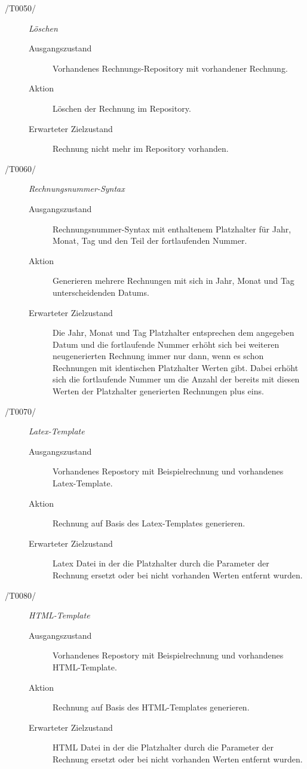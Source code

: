\begin{description}
  \item[/T0050/]
    \textit{Löschen}
    \begin{description}
    	\item[Ausgangszustand]
    	Vorhandenes Rechnungs-Repository mit vorhandener Rechnung.
    	\item[Aktion]
    	Löschen der Rechnung im Repository.
    	\item[Erwarteter Zielzustand]
    	Rechnung nicht mehr im Repository vorhanden.
    \end{description}
   
  \item[/T0060/]
    \textit{Rechnungsnummer-Syntax}
    \begin{description}
    	\item[Ausgangszustand]
    	Rechnungsnummer-Syntax mit enthaltenem Platzhalter für Jahr, Monat, Tag und den Teil der fortlaufenden Nummer.
    	\item[Aktion]
    	Generieren mehrere Rechnungen mit sich in Jahr, Monat und Tag unterscheidenden Datums.
    	\item[Erwarteter Zielzustand]
    	Die Jahr, Monat und Tag Platzhalter entsprechen dem angegeben Datum und die fortlaufende Nummer erhöht sich bei weiteren neugenerierten Rechnung immer nur dann, wenn es schon Rechnungen mit identischen Platzhalter Werten gibt. Dabei erhöht sich die fortlaufende Nummer um die Anzahl der bereits mit diesen Werten der Platzhalter generierten Rechnungen plus eins.
    \end{description}

  \item[/T0070/]
    \textit{Latex-Template}
    \begin{description}
    	\item[Ausgangszustand]
    	Vorhandenes Repostory mit Beispielrechnung und vorhandenes Latex-Template.
    	\item[Aktion]
    	Rechnung auf Basis des Latex-Templates generieren.
    	\item[Erwarteter Zielzustand]
    	Latex Datei in der die Platzhalter durch die Parameter der Rechnung ersetzt oder bei nicht vorhanden Werten entfernt wurden.
    \end{description}

  \item[/T0080/]
    \textit{HTML-Template}
    \begin{description}
    	\item[Ausgangszustand]
    	Vorhandenes Repostory mit Beispielrechnung und vorhandenes HTML-Template.
    	\item[Aktion]
    	Rechnung auf Basis des HTML-Templates generieren.
    	\item[Erwarteter Zielzustand]
    	HTML Datei in der die Platzhalter durch die Parameter der Rechnung ersetzt oder bei nicht vorhanden Werten entfernt wurden.
    \end{description}
\end{description}


